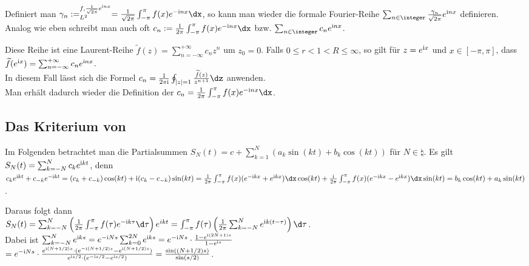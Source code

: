 Definiert man
$\gamma_n := \sp{f, \frac{1}{\sqrt{2\pi}} e^{\i nx}}_{L^2} =
\frac{1}{\sqrt{2\pi}} \int_{-\pi}^\pi f(x) e^{-\i nx}\dx$, so kann man wieder
die formale Fourier-Reihe
$\sum_{n \in \integer} \frac{\gamma_n}{\sqrt{2\pi}} e^{\i nx}$ definieren.\\
Analog wie eben schreibt man auch oft
$c_n := \frac{1}{2\pi} \int_{-\pi}^\pi f(x) e^{-\i nx} \dx$ bzw.
$\sum_{n \in \integer} c_n e^{\i nx}$.

\linie

Diese Reihe ist eine Laurent-Reihe
$\widetilde{f}(z) = \sum_{n=-\infty}^{+\infty} c_n z^n$ um $z_0 = 0$.
Falls $0 \le r < 1 < R \le \infty$, so gilt für $z = e^{\mathrm{i} x}$ und
$x \in [-\pi, \pi]$, dass
$\widetilde{f}(e^{\mathrm{i} x}) = \sum_{n=-\infty}^{+\infty} c_n e^{\mathrm{i} nx}$.\\
In diesem Fall lässt sich die Formel
$c_n = \frac{1}{2\pi\i} \oint_{|z| = 1} \frac{\widetilde{f}(z)}{z^{n+1}}\dz$
anwenden.\\
Man erhält dadurch wieder die Definition der
$c_n = \frac{1}{2\pi} \int_{-\pi}^\pi f(x) e^{-\i nx} \dx$.

\subsection{%
    Das Kriterium von %
}

Im Folgenden betrachtet man die Partialsummen
$S_N(t) = c + \sum_{k=1}^N (a_k \sin(kt) + b_k \cos(kt))$ für $N \in \natural$.
Es gilt
$S_N(t) = \sum_{k=-N}^N c_k e^{\mathrm{i} kt}$,
denn\\
$c_k e^{\i kt} + c_{-k} e^{-\i kt} =
(c_k + c_{-k}) \cos(kt) + \i (c_k - c_{-k}) \sin(kt) =
\frac{1}{2\pi} \int_{-\pi}^\pi f(x) (e^{-\i kx} + e^{\i kx}) \dx \cos(kt) +
\frac{\i}{2\pi} \int_{-\pi}^\pi f(x) (e^{-\i kx} - e^{\i kx}) \dx \sin(kt) =
b_k \cos(kt) + a_k \sin(kt)$.

Daraus folgt dann\\
$S_N(t) = \sum_{k=-N}^N \left(\frac{1}{2\pi}
\int_{-\pi}^{\pi} f(\tau) e^{-\i k\tau}\d\tau\right) e^{ikt}
= \int_{-\pi}^{\pi} f(\tau)
\left(\frac{1}{2\pi} \sum_{k=-N}^N e^{\i k(t - \tau)}\right)\d\tau$.\\
Dabei ist
$\sum_{k=-N}^N e^{\mathrm{i} ks} =
e^{-\mathrm{i} Ns} \sum_{k=0}^{2N} e^{\mathrm{i} ks} =
e^{-\mathrm{i} Ns} \cdot
\frac{1 - e^{\mathrm{i} (2N + 1)s}}{1 - e^{\mathrm{i} s}}$\\
$= e^{-\mathrm{i} Ns} \cdot
\frac{e^{\mathrm{i} (N + 1/2)s} \cdot
(e^{-\mathrm{i} (N + 1/2)s} - e^{\mathrm{i} (N + 1/2)s})}
{e^{\mathrm{i} s/2} \cdot (e^{-\mathrm{i} s/2} - e^{\mathrm{i} s/2})} =
\frac{\sin((N + 1/2) s)}{\sin(s/2)}$.

